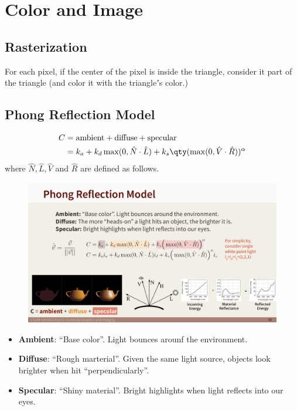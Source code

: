 \section{Color and Image}
\subsection{Rasterization}
For each pixel, if the center of the pixel is inside the triangle, consider it part of the triangle (and color it with the triangleʼs color.)
\subsection{Phong Reflection Model}
\[
	\begin{aligned}
		C&=
		\text{ambient}+\text{diffuse}+\text{specular}
		\\&=
		k_a+k_d\max(0,\hat{N}\cdot\hat{L})+k_s\qty(\max(0,\hat{V}\cdot\hat{R}))^\alpha
	\end{aligned}
\]
where $\hat{N}, \hat{L}, \hat{V}$ and $\hat{R}$ are defined as follows.
\begin{figure}[htpb]
	\centering
	\includegraphics[width=\linewidth]{img/prm.pdf}
	\label{fig:prm}
\end{figure}
\begin{itemize}
	\vspace{-2.5em}\item \textbf{Ambient}: ``Base color''. Light bounces arounf the environment.
	\vspace{-0.5em}\item \textbf{Diffuse}: ``Rough marterial''. Given the same light source, objects look brighter when hit ``perpendicularly''.
	\vspace{-0.5em}\item \textbf{Specular}: ``Shiny material''. Bright highlights when light reflects into our eyes.
\end{itemize}
